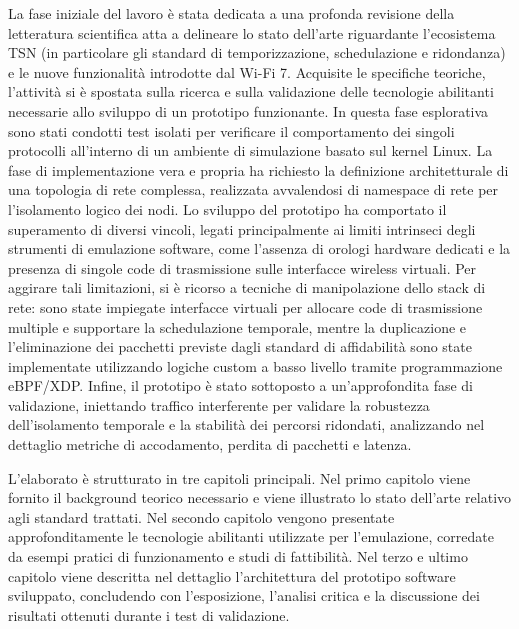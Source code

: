 \documentclass[12pt,a4paper,twoside]{book}
\begin{document}
La fase iniziale del lavoro è stata dedicata a una profonda revisione della letteratura scientifica atta a delineare lo stato dell'arte riguardante l'ecosistema TSN (in particolare gli standard di temporizzazione, schedulazione e ridondanza) e le nuove funzionalità introdotte dal Wi-Fi 7. Acquisite le specifiche teoriche, l'attività si è spostata sulla ricerca e sulla validazione delle tecnologie abilitanti necessarie allo sviluppo di un prototipo funzionante. In questa fase esplorativa sono stati condotti test isolati per verificare il comportamento dei singoli protocolli all'interno di un ambiente di simulazione basato sul kernel Linux. 
\newpage
La fase di implementazione vera e propria ha richiesto la definizione architetturale di una topologia di rete complessa, realizzata avvalendosi di namespace di rete per l'isolamento logico dei nodi. Lo sviluppo del prototipo ha comportato il superamento di diversi vincoli, legati principalmente ai limiti intrinseci degli strumenti di emulazione software, come l'assenza di orologi hardware dedicati e la presenza di singole code di trasmissione sulle interfacce wireless virtuali. Per aggirare tali limitazioni, si è ricorso a tecniche di manipolazione dello stack di rete: sono state impiegate interfacce virtuali per allocare code di trasmissione multiple e supportare la schedulazione temporale, mentre la duplicazione e l'eliminazione dei pacchetti previste dagli standard di affidabilità sono state implementate utilizzando logiche custom a basso livello tramite programmazione eBPF/XDP. Infine, il prototipo è stato sottoposto a un'approfondita fase di validazione, iniettando traffico interferente per validare la robustezza dell'isolamento temporale e la stabilità dei percorsi ridondati, analizzando nel dettaglio metriche di accodamento, perdita di pacchetti e latenza.

L'elaborato è strutturato in tre capitoli principali. Nel primo capitolo viene fornito il background teorico necessario e viene illustrato lo stato dell'arte relativo agli standard trattati. Nel secondo capitolo vengono presentate approfonditamente le tecnologie abilitanti utilizzate per l'emulazione, corredate da esempi pratici di funzionamento e studi di fattibilità. Nel terzo e ultimo capitolo viene descritta nel dettaglio l'architettura del prototipo software sviluppato, concludendo con l'esposizione, l'analisi critica e la discussione dei risultati ottenuti durante i test di validazione.

\endgroup
\normalfont

\topmargin=-1cm
\tableofcontents
\end{document}
